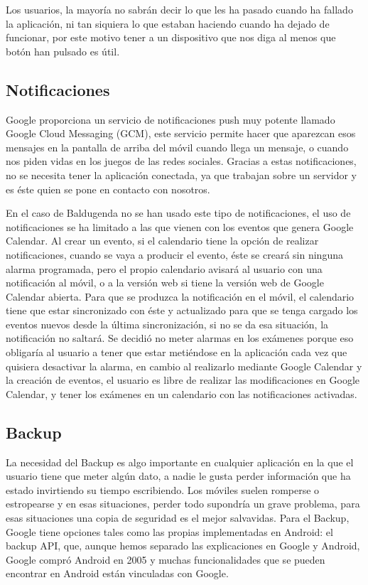 Los usuarios, la mayoría no sabrán decir lo que les ha pasado cuando ha fallado la aplicación, ni tan siquiera lo que estaban haciendo cuando ha dejado de funcionar, por este motivo tener a un dispositivo que nos diga al menos que botón han pulsado es útil.
 


\subsection{Notificaciones}
\label{subsecc:Notificaciones}

Google proporciona un servicio de notificaciones push muy potente llamado Google Cloud Messaging (GCM), este servicio permite hacer que aparezcan esos mensajes en la pantalla de arriba del móvil cuando llega un mensaje, o cuando nos piden vidas en los juegos de las redes sociales.
Gracias a estas notificaciones, no se necesita tener la aplicación conectada, ya que trabajan sobre un servidor y es éste quien se pone en contacto con nosotros.

En el caso de Baldugenda no se han usado este tipo de notificaciones, el uso de notificaciones se ha limitado a las que vienen con los eventos que genera Google Calendar.
Al crear un evento, si el calendario tiene la opción de realizar notificaciones, cuando se vaya a producir el evento, éste se creará sin ninguna alarma programada, pero el propio calendario avisará al usuario con una notificación al móvil, o a la versión web si tiene la versión web de Google Calendar abierta.
Para que se produzca la notificación en el móvil, el calendario tiene que estar sincronizado con éste y actualizado para que se tenga cargado los eventos nuevos desde la última sincronización, si no se da esa situación, la notificación no saltará.
Se decidió no meter alarmas en los exámenes porque eso obligaría al usuario a tener que estar metiéndose en la aplicación cada vez que quisiera desactivar la alarma, en cambio al realizarlo mediante Google Calendar y la creación de eventos, el usuario es libre de realizar las modificaciones en Google Calendar, y tener los exámenes en un calendario con las notificaciones activadas.

\subsection{Backup}
\label{subsecc:Backup}

La necesidad del Backup es algo importante en cualquier aplicación en la que el usuario tiene que meter algún dato, a nadie le gusta perder información que ha estado invirtiendo su tiempo escribiendo. Los móviles suelen romperse o estropearse y en esas situaciones, perder todo supondría un grave problema, para esas situaciones una copia de seguridad es el mejor salvavidas.
Para el Backup, Google tiene opciones tales como las propias implementadas en Android: el backup API, que, aunque hemos separado las explicaciones en Google y Android, Google compró Android en 2005 y muchas funcionalidades que se pueden encontrar en Android están vinculadas con Google.

